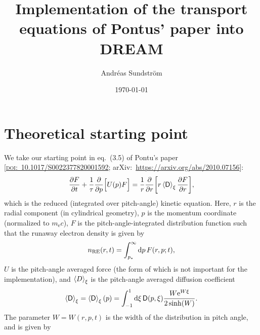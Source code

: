 \documentclass[11pt,a4paper,english
]{article}
\newcommand{\ee}{\mathrm{e}}
\newcommand{\nRE}{\ensuremath{n_{\rm RE}}}
\newcommand{\nuD}{\ensuremath{\nu_{\rm D}}}
\newcommand{\nus}{\ensuremath{\nu_{\rm s}}}
\begin{document}


\title{Implementation of the transport equations of 
 Pontus' paper into DREAM}
\author{Andr\'eas Sundstr\"om}
\date{\today}

\maketitle



\section{Theoretical starting point}
We take our starting point in eq.~(3.5) of Pontu's paper
[\href{https://doi.org/10.1017/S0022377820001592}{\textsc{doi}:~10.1017/S0022377820001592};
arXiv:~\url{https://arxiv.org/abs/2010.07156}]:
\begin{equation}\label{eq:reduced-kinetic}
\pdv{F}{t}+\frac{1}{\tau}\pdv{p}\qty[\Big.U(p)F]
=\frac{1}{r}\pdv{r}\qty[r\ev{\mathsf{D}}_\xi\pdv{F}{r}],
\end{equation}
which is the reduced (integrated over pitch-angle) kinetic
equation. Here, $r$ is the radial component (in cylindrical geometry),
$p$ is the momentum coordinate (normalized to $m_{\ee}c$), $F$ is the
pitch-angle-integrated distribution function such that the runaway
electron density is given by
\begin{equation}
\nRE(r,t) = \int_{p_*}^{\infty}\dd{p}F(r,p;t),
\end{equation}
$U$ is the pitch-angle averaged force (the form of which is not
important for the implementation),
and $\ev{D}_{\xi}$ is the pitch-angle averaged diffusion coefficient
\begin{equation}\label{eq:ev_D_xi}
\ev{\mathsf{D}}_{\xi}=\ev{\mathsf{D}}_{\xi}(p)
=\int_{-1}^{1}\dd{\xi} \mathsf{D}(p,\xi)\frac{W\ee^{W\xi}}{2\sinh(W)}.
\end{equation}
The parameter $W=W(r,p,t)$ is the width of the distribution in pitch
angle, and is given by
\end{document}
